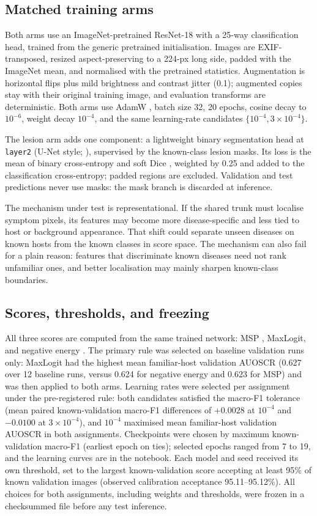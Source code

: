 \documentclass[10pt,a4paper]{article}
\begin{document}
\subsection{Matched training arms}
Both arms use an ImageNet-pretrained ResNet-18 \citep{he2016deep} with a 25-way classification head,
trained from the generic pretrained initialisation. Images are EXIF-transposed, resized aspect-preserving
to a 224-px long side, padded with the ImageNet mean, and normalised with the pretrained statistics.
Augmentation is horizontal flips plus mild brightness and contrast jitter (0.1); augmented copies stay
with their original training image, and evaluation transforms are deterministic. Both arms use AdamW
\citep{loshchilov2019decoupled}, batch size 32, 20 epochs, cosine decay to $10^{-6}$, weight decay
$10^{-4}$, and the same learning-rate candidates $\{10^{-4}, 3\times10^{-4}\}$.

The lesion arm adds one component: a lightweight binary segmentation head at \texttt{layer2}
(U-Net style; \citealp{ronneberger2015unet}), supervised by the known-class lesion masks. Its loss is the
mean of binary cross-entropy and soft Dice \citep{milletari2016vnet}, weighted by 0.25 and added to the
classification cross-entropy; padded regions are excluded. Validation and test predictions never use
masks: the mask branch is discarded at inference.

The mechanism under test is representational. If the shared trunk must localise symptom pixels, its
features may become more disease-specific and less tied to host or background appearance. That shift could
separate unseen diseases on known hosts from the known classes in score space. The mechanism can also
fail for a plain reason: features that discriminate known diseases need not rank unfamiliar ones, and
better localisation may mainly sharpen known-class boundaries.

\subsection{Scores, thresholds, and freezing}
All three scores are computed from the same trained network: MSP \citep{hendrycks2017baseline}, MaxLogit,
and negative energy \citep{liu2020energy}. The primary rule was selected on baseline validation runs
only: MaxLogit had the highest mean familiar-host validation AUOSCR (0.627 over 12 baseline runs, versus
0.624 for negative energy and 0.623 for MSP) and was then applied to both arms. Learning rates were
selected per assignment under the pre-registered rule: both candidates satisfied the macro-F1 tolerance
(mean paired known-validation macro-F1 differences of $+0.0028$ at $10^{-4}$ and $-0.0100$ at
$3\times10^{-4}$), and $10^{-4}$ maximised mean familiar-host validation AUOSCR in both assignments.
Checkpoints were chosen by maximum known-validation macro-F1 (earliest epoch on ties); selected epochs
ranged from 7 to 19, and the learning curves are in the notebook. Each model and seed received its own
threshold, set to the largest known-validation score accepting at least 95\% of known validation images
(observed calibration acceptance 95.11--95.12\%). All choices for both assignments, including weights and
thresholds, were frozen in a checksummed file before any test inference.
\end{document}
